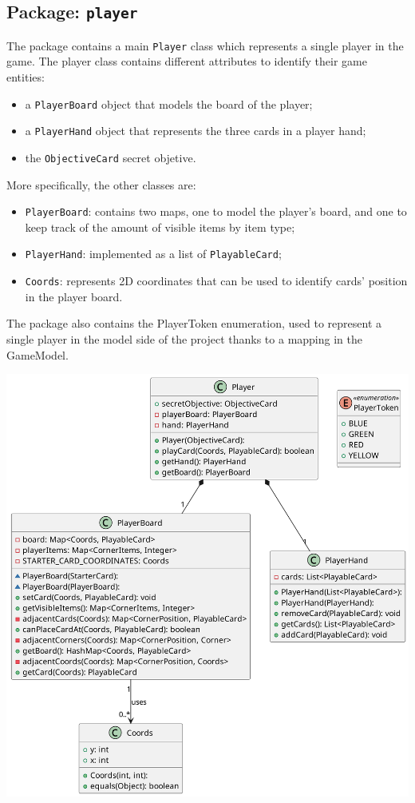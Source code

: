 \documentclass{article}
\begin{document}
\newpage
\subsection{Package: \texttt{player}}
The package contains a main \texttt{Player} class which represents a single player in the game.
The player class contains different attributes to identify their game entities:
\begin{itemize}
    \item a \texttt{PlayerBoard} object that models the board of the player;
    \item a \texttt{PlayerHand} object that represents the three cards in a player hand;
    \item the \texttt{ObjectiveCard} secret objetive.
\end{itemize}

\noindent
More specifically, the other classes are:
\begin{itemize}
    \item \texttt{PlayerBoard}: contains two maps, one to model the player's board, and one to keep track of the amount of visible items by item type;
    \item \texttt{PlayerHand}: implemented as a list of \texttt{PlayableCard};
    \item \texttt{Coords}: represents 2D coordinates that can be used to identify cards' position in the player board.
\end{itemize}
\noindent
The package also contains the PlayerToken enumeration, used to represent a single player in the model side of the project thanks to a mapping in the GameModel.

\vspace{0.2cm}
\begin{center}
    \hspace*{-2cm}\includegraphics[scale=0.1]{pngs/player}
\end{center}
\end{document}
